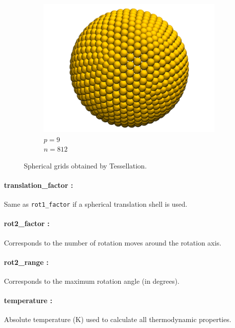 \documentclass[10pt,a4paper]{report}
\begin{document}
\begin{figure}[!h]
\begin{subfigure}[t]{0.18\textwidth}
    \includegraphics[width=\textwidth]{figures/grid_812.png} 
    \footnotesize
    $p = 9$ \\
    $n = 812$
  \end{subfigure}
  \caption{Spherical grids obtained by Tessellation.}
  \label{fig:spherical_grid}
\end{figure}


\paragraph{translation\_factor :} 

Same as \texttt{rot1\_factor} if a spherical translation shell is used.

\paragraph{rot2\_factor :} 

Corresponds to the number of rotation moves around the rotation axis. 
  
\paragraph{rot2\_range :} 

Corresponds to the maximum rotation angle (in degrees). 

\paragraph{temperature :} 

Absolute temperature (K) used to calculate all thermodynamic properties. 
\end{document}
